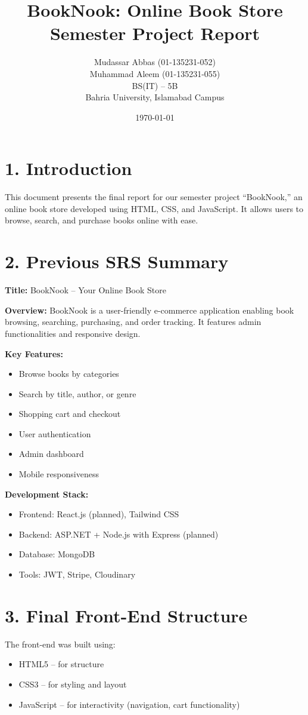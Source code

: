 \documentclass[12pt]{article}
\title{BookNook: Online Book Store\\\large Semester Project Report}
\author{
Mudassar Abbas (01-135231-052)\\
Muhammad Aleem (01-135231-055)\\
BS(IT) – 5B\\
Bahria University, Islamabad Campus
}
\date{\today}
\begin{document}
\maketitle

\section*{1. Introduction}
This document presents the final report for our semester project ``BookNook,'' an online book store developed using HTML, CSS, and JavaScript. It allows users to browse, search, and purchase books online with ease.

\section*{2. Previous SRS Summary}
\textbf{Title:} BookNook – Your Online Book Store

\textbf{Overview:} BookNook is a user-friendly e-commerce application enabling book browsing, searching, purchasing, and order tracking. It features admin functionalities and responsive design.

\textbf{Key Features:}
\begin{itemize}
    \item Browse books by categories
    \item Search by title, author, or genre
    \item Shopping cart and checkout
    \item User authentication
    \item Admin dashboard
    \item Mobile responsiveness
\end{itemize}

\textbf{Development Stack:}
\begin{itemize}
    \item Frontend: React.js (planned), Tailwind CSS
    \item Backend: ASP.NET + Node.js with Express (planned)
    \item Database: MongoDB
    \item Tools: JWT, Stripe, Cloudinary
\end{itemize}

\section*{3. Final Front-End Structure}
The front-end was built using:
\begin{itemize}
    \item HTML5 – for structure
    \item CSS3 – for styling and layout
    \item JavaScript – for interactivity (navigation, cart functionality)
\end{itemize}
\end{document}
